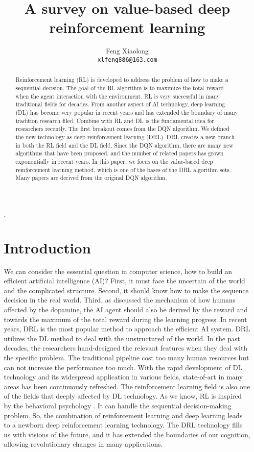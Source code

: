 \documentclass{article}
\title{A survey on value-based deep reinforcement learning}
\author{Feng Xiaolong  \\
	\texttt{xlfeng886@163.com} \\
}
\begin{document}
\maketitle



.
\begin{abstract}
Reinforcement learning (RL) is developed to address the problem of how to make a sequential decision. The goal of the RL algorithm is to maximize the total reward when the agent interaction with the environment. RL is very successful in many traditional fields for decades. From another aspect of AI technology,  deep learning (DL) has become very popular in recent years and has extended the boundary of many tradition research filed. Combine with RL and DL is the fundamental idea for researchers recently. The first breakout comes from the DQN algorithm. We defined the new technology as deep reinforcement learning (DRL). DRL creates a new branch in both the RL field and the DL field. Since the DQN algorithm, there are many new algorithms that have been proposed, and the number of related papers has grown exponentially in recent years. In this paper, we focus on the value-based deep reinforcement learning method, which is one of the bases of the DRL algorithm sets. Many papers are derived from the original DQN algorithm.
\end{abstract}
%
\section{Introduction}
\label{sec:Introduction}
We can consider the essential question in computer science, how to build an efficient artificial intelligence (AI)? First, it must face the uncertain of the world and the complicated structure. Second, it should know how to make the sequence decision in the real world. Third, as \citep{sutton2018reinforcement} discussed the mechanism of how humans affected by the dopamine, the AI agent should also be derived by the reward and towards the maximum of the total reward during the learning progress. In recent years, DRL is the most popular method to approach the efficient AI system. DRL utilizes the DL method to deal with the unstructured of the world. 
In the past decades, the researchers hand-designed the relevant features when they deal with the specific problem. The traditional pipeline cost too many human resources but can not increase the performance too much. With the rapid development of DL technology and its widespread application in various fields, state-of-art in many areas has been continuously refreshed. The reinforcement learning field is also one of the fields that deeply affected by DL technology. As we know, RL is inspired by the behavioral psychology   \citep{sutton2018reinforcement}. It can handle the sequential decision-making problem. So, the combination of reinforcement learning and deep learning leads to a newborn deep reinforcement learning technology. The DRL technology fills us with visions of the future, and it has extended the boundaries of our cognition, allowing revolutionary changes in many applications.
\end{document}
